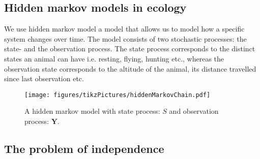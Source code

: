 \subsection*{Hidden markov models in ecology}
We use hidden markov model a model that allows us to model how a specific system changes over time. The model consists of two stochastic processes: the state- and the observation process. The state process corresponds to the distinct states an animal can have i.e. resting, flying, hunting etc., whereas the observation state corresponds to the altitude of the animal, its distance travelled since last observation etc.
\begin{figure}[h]
    \centering
    \texttt{[image: figures/tikzPictures/hiddenMarkovChain.pdf]}
    \caption{A hidden markov model with state process: $S$ and observation process: $\mathbf{Y}$.}
\end{figure}
\subsection*{The problem of independence}